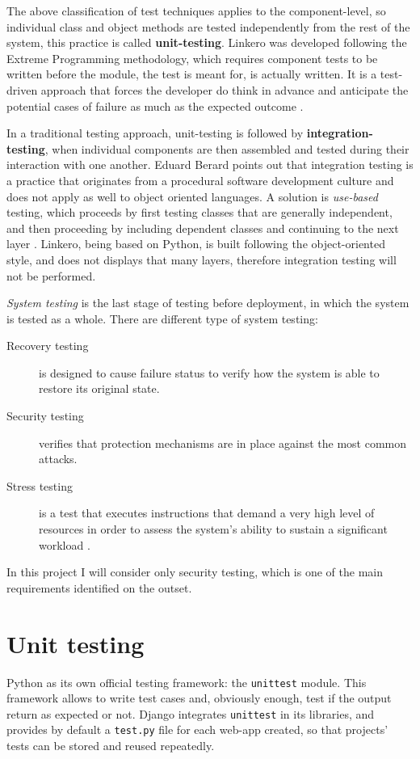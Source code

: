 The above classification of test techniques applies to the component-level, so
individual class and object methods are tested independently from the rest of
the system, this practice is called \textbf{unit-testing}. Linkero was developed
following the Extreme Programming methodology, which requires component tests to
be written before the module, the test is meant for, is actually written. It is
a test-driven approach that forces the developer do think in advance and
anticipate the potential cases of failure as much as the expected outcome
\cite{VV08}.

In a traditional testing approach, unit-testing is followed by
\textbf{integration-testing}, when individual components are then assembled and
tested during their interaction with one another. Eduard Berard points out that
integration testing is a practice that originates from a procedural software
development culture and does not apply as well to object oriented languages. A
solution is \emph{use-based} testing, which proceeds by first testing classes
that are generally independent, and then proceeding by including dependent
classes and continuing to the next layer \cite{EB93}. Linkero, being based on
Python, is built following the object-oriented style, and does not displays that
many layers, therefore integration testing will not be performed.

\emph{System testing} is the last stage of testing before deployment, in which
the system is tested as a whole. There are different type of system testing:
\begin{description}
\item[Recovery testing] is designed to cause failure status to verify how the
system is able to restore its original state.
\item[Security testing] verifies that protection mechanisms are in place against
the most common attacks.
\item[Stress testing] is a test that executes instructions that demand a very
high level of resources in order to assess the system's ability to sustain a
significant workload \cite{RP05}.
\end{description}

In this project I will consider only security testing, which is one of the main
requirements identified on the outset.


\section{Unit testing}
Python as its own official testing framework: the \texttt{unittest} module. This
framework allows to write test cases and, obviously enough, test if the output
return as expected or not. Django integrates \texttt{unittest} in its libraries,
and provides by default a \texttt{test.py} file for each web-app created, so
that projects' tests can be stored and reused repeatedly.

